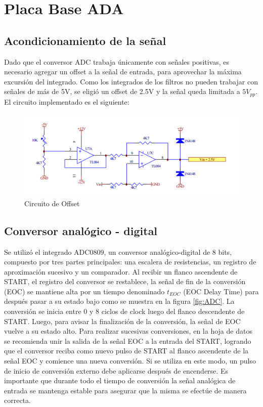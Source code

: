 \documentclass[assd_tp3_main.tex]{subfiles}
\begin{document}
\section{Placa Base ADA}
\subsection{Acondicionamiento de la señal}
Dado que el conversor ADC trabaja únicamente con señales positivas, es necesario agregar un offset a la señal de entrada, para aprovechar la máxima excursión del integrado. Como los integrados de los filtros no pueden trabajar con señales de más de 5V, se eligió un offset de 2.5V y la señal queda limitada a $5V_{pp}$. El circuito implementado es el siguiente:

\begin{figure}[H]
	\centering
	\includegraphics[width=0.6 \textwidth]
	{images/ej1/offset.png}
	\caption{Circuito de Offset}
	\label{fig:offset}
\end{figure}

\subsection{Conversor analógico - digital}
Se utilizó el integrado ADC0809, un conversor analógico-digital de 8 bits, compuesto
por tres partes principales: una escalera de resistencias, un registro de aproximación
sucesivo y un comparador.
Al recibir un flanco ascendente de START, el registro del conversor se restablece, la
señal de fin de la conversión (EOC) se mantiene alta por un tiempo denominado $t_{EOC}$
(EOC Delay Time) para después pasar a su estado bajo como se muestra en la
figura \ref{fig:ADC}. La conversión se inicia entre 0 y 8 ciclos de clock luego del flanco descendente de START. Luego, para avisar la finalización de la conversión, la señal de
EOC vuelve a su estado alto.
Para realizar sucesivas conversiones, en la hoja de datos se recomienda unir la salida
de la señal EOC a la entrada del START, logrando que el conversor reciba como nuevo
pulso de START al flanco ascendente de la señal EOC y comience una nueva
conversión. Si se utiliza en este modo, un pulso de inicio de conversión externo debe
aplicarse después de encenderse.
Es importante que durante todo el tiempo de conversión la señal analógica de entrada
se mantenga estable para asegurar que la misma se efectúe de manera correcta. 
\end{document}
